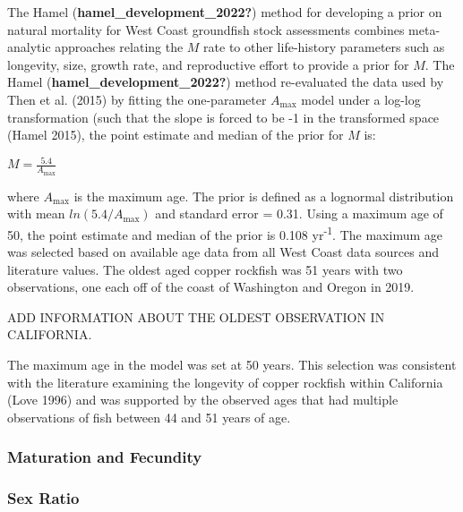 \documentclass[11pt,
  english,
  letterpaper,
]{article}
\begin{document}
The Hamel (\textbf{hamel\_development\_2022?}) method for developing a prior on natural mortality for West Coast groundfish stock assessments combines meta-analytic approaches relating the \(M\) rate to other life-history parameters such as longevity, size, growth rate, and reproductive effort to provide a prior for \(M\). The Hamel (\textbf{hamel\_development\_2022?}) method re-evaluated the data used by Then et al. (2015) by fitting the one-parameter \(A_{\text{max}}\) model under a log-log transformation (such that the slope is forced to be -1 in the transformed space (Hamel 2015), the point estimate and median of the prior for \(M\) is:

\begin{centering}

$M=\frac{5.4}{A_{\text{max}}}$

\end{centering}

\vspace{0.5cm}

where \(A_{\text{max}}\) is the maximum age. The prior is defined as a lognormal distribution with mean \(ln(5.4/A_{\text{max}})\) and standard error = 0.31. Using a maximum age of 50, the point estimate and median of the prior is 0.108 yr\textsuperscript{-1}. The maximum age was selected based on available age data from all West Coast data sources and literature values. The oldest aged copper rockfish was 51 years with two observations, one each off of the coast of Washington and Oregon in 2019.

ADD INFORMATION ABOUT THE OLDEST OBSERVATION IN CALIFORNIA.

The maximum age in the model was set at 50 years. This selection was consistent with the literature examining the longevity of copper rockfish within California (Love 1996) and was supported by the observed ages that had multiple observations of fish between 44 and 51 years of age.

\hypertarget{maturation-and-fecundity}{%
\subsubsection{Maturation and Fecundity}\label{maturation-and-fecundity}}

\hypertarget{sex-ratio}{%
\subsubsection{Sex Ratio}\label{sex-ratio}}
\end{document}
